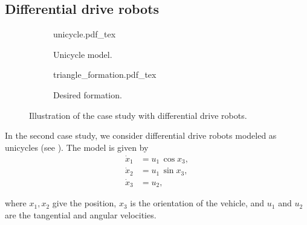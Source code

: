 \subsection{Differential drive robots}
\begin{figure}[b]
    \centering
    \begin{subfigure}[t]{0.35\textwidth}
        \centering
        \def\svgwidth{0.71\textwidth}
        {unicycle.pdf_tex}
        \vspace*{-1.5mm}
        \caption{Unicycle model.}
        \label{fig:MPC_unicycle}        
        \vspace*{-3mm}
    \end{subfigure}
    \hspace*{0.1\textwidth}
    \begin{subfigure}[t]{0.35\textwidth}
        \centering
        \def\svgwidth{0.71\textwidth}
        {triangle_formation.pdf_tex}
        \vspace*{-1mm}
        \caption{Desired formation.}
        \label{fig:MPC_triangle_formation}
        \vspace*{-3mm}
    \end{subfigure}
    \caption{Illustration of the case study with differential drive robots.}
\end{figure}

In the second case study, we consider differential drive robots modeled as unicycles (see ).
The model is given by
\begin{subequations}
    \begin{align}
        \dot{x}_1 &= u_1\,\cos x_3, \\
        \dot{x}_2 &= u_1\,\sin x_3, \\
        \dot{x}_3 &= u_2,
    \end{align} \label{eq:MPC_unicycle_ode_x} 
\end{subequations}

\noindent where $x_1, x_2$ give the position, $x_3$ is the orientation of the vehicle, and $u_1$ and $u_2$ are the tangential and angular velocities.

